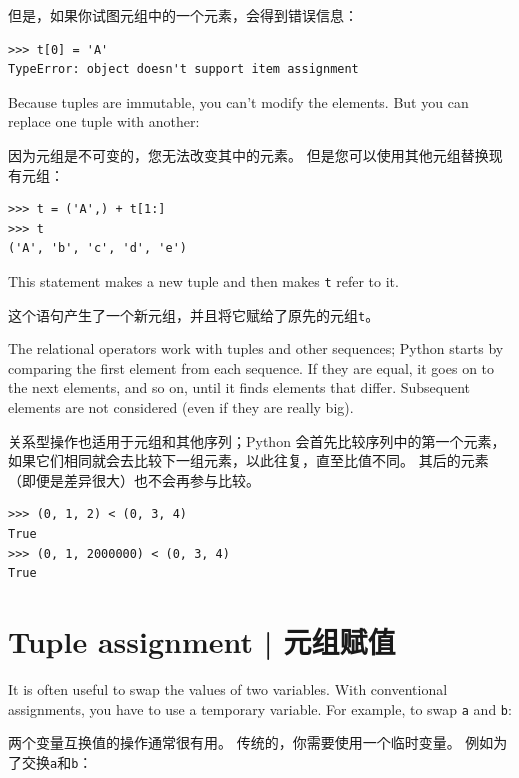 但是，如果你试图元组中的一个元素，会得到错误信息：


\begin{lstlisting}
>>> t[0] = 'A'
TypeError: object doesn't support item assignment
\end{lstlisting}
%
Because tuples are immutable, you can't modify the elements.  But you
can replace one tuple with another:

因为元组是不可变的，您无法改变其中的元素。 但是您可以使用其他元组替换现有元组：

\begin{lstlisting}
>>> t = ('A',) + t[1:]
>>> t
('A', 'b', 'c', 'd', 'e')
\end{lstlisting}
%
This statement makes a new tuple and then makes {\tt t} refer to it.

这个语句产生了一个新元组，并且将它赋给了原先的元组\lstinline{t}。

The relational operators work with tuples and other sequences;
Python starts by comparing the first element from each
sequence.  If they are equal, it goes on to the next elements,
and so on, until it finds elements that differ.  Subsequent
elements are not considered (even if they are really big).

关系型操作也适用于元组和其他序列；Python 会首先比较序列中的第一个元素，如果它们相同就会去比较下一组元素，以此往复，直至比值不同。 其后的元素（即便是差异很大）也不会再参与比较。


\begin{lstlisting}
>>> (0, 1, 2) < (0, 3, 4)
True
>>> (0, 1, 2000000) < (0, 3, 4)
True
\end{lstlisting}


\section{Tuple assignment | 元组赋值}
\label{tuple.assignment}  
 

It is often useful to swap the values of two variables.
With conventional assignments, you have to use a temporary
variable.  For example, to swap {\tt a} and {\tt b}:

两个变量互换值的操作通常很有用。 传统的，你需要使用一个临时变量。 例如为了交换\lstinline{a}和\lstinline{b}：


